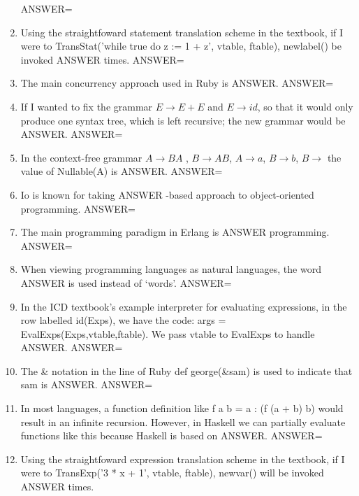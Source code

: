 \documentclass{exam}
\begin{document}
\begin{enumerate}
ANSWER=
\item Using the straightfoward statement translation scheme in the textbook, if I were to TransStat('while true do z := 1 + z', vtable, ftable), newlabel() be invoked ANSWER times.\newline
ANSWER=
\item The main concurrency approach used in Ruby is ANSWER.\newline
ANSWER=
\item If I wanted to fix the grammar $E \rightarrow E + E$ and $E \rightarrow id$, so that it would only produce one syntax tree, which is left recursive; the new grammar would be ANSWER.\newline
ANSWER=
\item In the context-free grammar $A \rightarrow B A$ , $B \rightarrow A B$, $A \rightarrow a$, $B \rightarrow b$, $B \rightarrow$  the value of Nullable(A) is ANSWER.\newline
ANSWER=
\item Io is known for taking ANSWER -based approach to object-oriented programming.\newline
ANSWER=
\item The main programming paradigm in Erlang is ANSWER programming.\newline
ANSWER=
\item When viewing programming languages as natural languages, the word ANSWER is used instead of `words'.\newline
ANSWER=
\item In the ICD textbook's example interpreter for evaluating expressions, in the row labelled id(Exps), we have the code: args = EvalExps(Exps,vtable,ftable).  We pass vtable to EvalExps to handle ANSWER.\newline
ANSWER=
\item The \& notation in the line of Ruby def george(\&sam) is used to indicate that sam is ANSWER.\newline
ANSWER=
\item In most languages, a function definition like f a b = a : (f (a + b) b) would result in an infinite recursion.  However, in Haskell we can partially evaluate functions like this because Haskell is based on ANSWER.\newline
ANSWER=
\item Using the straightfoward expression translation scheme in the textbook, if I were to TransExp('3 * x + 1', vtable, ftable), newvar() will be invoked ANSWER times.\newline

\end{enumerate}
\end{document}

